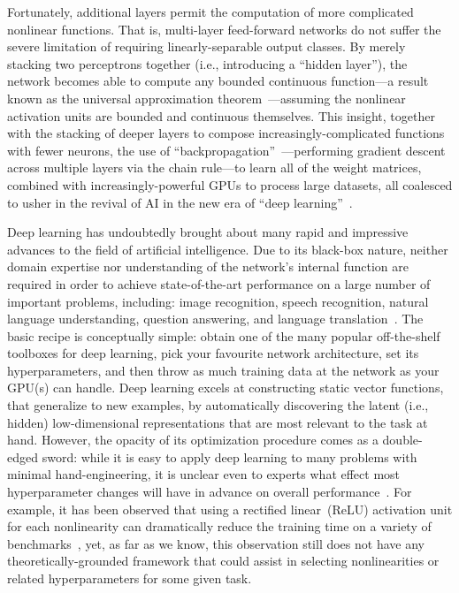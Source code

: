Fortunately, additional layers permit the computation of more complicated nonlinear functions.
That is, multi-layer feed-forward networks do not suffer the severe limitation of requiring linearly-separable output classes.
By merely stacking two perceptrons together (i.e., introducing a ``hidden layer''), the network becomes able to compute any bounded continuous function---a result known as the universal approximation theorem~\citep{hornik1989multilayer}---assuming the nonlinear activation units are bounded and continuous themselves.
This insight, together with the stacking of deeper layers to compose increasingly-complicated functions with fewer neurons, the use of ``backpropagation''~\citep{werbos1974beyond, rumelhart1986learning}---performing gradient descent across multiple layers via the chain rule---to learn all of the weight matrices, combined with increasingly-powerful GPUs to process large datasets, all coalesced to usher in the revival of AI in the new era of ``deep learning''~\citep{sejnowski2018deep}.

Deep learning has undoubtedly brought about many rapid and impressive advances to the field of artificial intelligence.
Due to its black-box nature, neither domain expertise nor understanding of the network's internal function are required in order to achieve state-of-the-art performance on a large number of important problems, including: image recognition, speech recognition, natural language understanding, question answering, and language translation~\citep{lecun2015deep}.
The basic recipe is conceptually simple: obtain one of the many popular off-the-shelf toolboxes for deep learning, pick your favourite network architecture, set its hyperparameters, and then throw as much training data at the network as your GPU(s) can handle.
Deep learning excels at constructing static vector functions, that generalize to new examples, by automatically discovering the latent (i.e., hidden) low-dimensional representations that are most relevant to the task at hand.
However, the opacity of its optimization procedure comes as a double-edged sword: while it is easy to apply deep learning to many problems with minimal hand-engineering, it is unclear even to experts what effect most hyperparameter changes will have in advance on overall performance~\citep{bergstra2012random}.
For example, it has been observed that using a rectified linear~(ReLU) activation unit for each nonlinearity can dramatically reduce the training time on a variety of benchmarks~\citep{glorot2011deep}, yet, as far as we know, this observation still does not have any theoretically-grounded framework that could assist in selecting nonlinearities or related hyperparameters for some given task.

